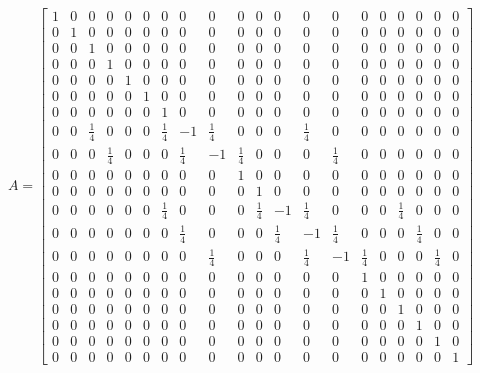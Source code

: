\documentclass[a4paper]{article}
\begin{document}
\[
A = 
\begin{bmatrix}
  1 & 0 & 0 & 0 & 0 & 0 & 0 & 0 & 0 & 0 & 0 & 0 & 0 & 0 & 0 & 0 & 0 & 0 & 0 & 0 \\
  0 & 1 & 0 & 0 & 0 & 0 & 0 & 0 & 0 & 0 & 0 & 0 & 0 & 0 & 0 & 0 & 0 & 0 & 0 & 0 \\
  0 & 0 & 1 & 0 & 0 & 0 & 0 & 0 & 0 & 0 & 0 & 0 & 0 & 0 & 0 & 0 & 0 & 0 & 0 & 0 \\
  0 & 0 & 0 & 1 & 0 & 0 & 0 & 0 & 0 & 0 & 0 & 0 & 0 & 0 & 0 & 0 & 0 & 0 & 0 & 0 \\
  0 & 0 & 0 & 0 & 1 & 0 & 0 & 0 & 0 & 0 & 0 & 0 & 0 & 0 & 0 & 0 & 0 & 0 & 0 & 0 \\
  0 & 0 & 0 & 0 & 0 & 1 & 0 & 0 & 0 & 0 & 0 & 0 & 0 & 0 & 0 & 0 & 0 & 0 & 0 & 0 \\
  0 & 0 & 0 & 0 & 0 & 0 & 1 & 0 & 0 & 0 & 0 & 0 & 0 & 0 & 0 & 0 & 0 & 0 & 0 & 0 \\
  0 & 0 & \frac{1}{4} & 0 & 0 & 0 & \frac{1}{4} & -1 & \frac{1}{4} & 0 & 0 & 0 & \frac{1}{4} & 0 & 0 & 0 & 0 & 0 & 0 & 0 \\
  0 & 0 & 0 & \frac{1}{4} & 0 & 0 & 0 & \frac{1}{4} & -1 & \frac{1}{4} & 0 & 0 & 0 & \frac{1}{4} & 0 & 0 & 0 & 0 & 0 & 0 \\
  0 & 0 & 0 & 0 & 0 & 0 & 0 & 0 & 0 & 1 & 0 & 0 & 0 & 0 & 0 & 0 & 0 & 0 & 0 & 0 \\
  0 & 0 & 0 & 0 & 0 & 0 & 0 & 0 & 0 & 0 & 1 & 0 & 0 & 0 & 0 & 0 & 0 & 0 & 0 & 0 \\
  0 & 0 & 0 & 0 & 0 & 0 & \frac{1}{4} & 0 & 0 & 0 & \frac{1}{4} & -1 & \frac{1}{4} & 0 & 0 & 0 & \frac{1}{4} & 0 & 0 & 0 \\
  0 & 0 & 0 & 0 & 0 & 0 & 0 & \frac{1}{4} & 0 & 0 & 0 & \frac{1}{4} & -1 & \frac{1}{4} & 0 & 0 & 0 & \frac{1}{4} & 0 & 0 \\
  0 & 0 & 0 & 0 & 0 & 0 & 0 & 0 & \frac{1}{4} & 0 & 0 & 0 & \frac{1}{4} & -1 & \frac{1}{4} & 0 & 0 & 0 & \frac{1}{4} & 0 \\
  0 & 0 & 0 & 0 & 0 & 0 & 0 & 0 & 0 & 0 & 0 & 0 & 0 & 0 & 1 & 0 & 0 & 0 & 0 & 0 \\
  0 & 0 & 0 & 0 & 0 & 0 & 0 & 0 & 0 & 0 & 0 & 0 & 0 & 0 & 0 & 1 & 0 & 0 & 0 & 0 \\
  0 & 0 & 0 & 0 & 0 & 0 & 0 & 0 & 0 & 0 & 0 & 0 & 0 & 0 & 0 & 0 & 1 & 0 & 0 & 0 \\
  0 & 0 & 0 & 0 & 0 & 0 & 0 & 0 & 0 & 0 & 0 & 0 & 0 & 0 & 0 & 0 & 0 & 1 & 0 & 0 \\
  0 & 0 & 0 & 0 & 0 & 0 & 0 & 0 & 0 & 0 & 0 & 0 & 0 & 0 & 0 & 0 & 0 & 0 & 1 & 0 \\
  0 & 0 & 0 & 0 & 0 & 0 & 0 & 0 & 0 & 0 & 0 & 0 & 0 & 0 & 0 & 0 & 0 & 0 & 0 & 1 



\end{bmatrix}\]
\end{document}
